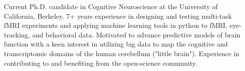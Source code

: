 

\begin{cvparagraph}

Current Ph.D. candidate in Cognitive Neuroscience at the University of California, Berkeley. 7+ years experience in designing and testing multi-task fMRI experiments and applying machine learning tools in python to fMRI, eye-tracking, and behavioral data. Motivated to advance predictive models of brain function with a keen interest in 
utilizing big data to map the cognitive and transcriptomic domains of the human cerebellum ("little brain"). Experience in contributing to and benefiting from the open-science community. 

\end{cvparagraph}
